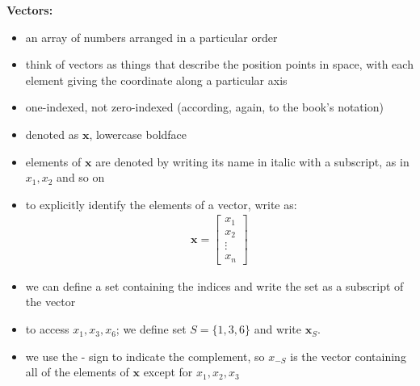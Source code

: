 \documentclass[11pt,twocolumn]{report}
\begin{document}
\large\textbf{Vectors:}
\begin{itemize}
	\item an array of numbers arranged in a particular order
	\item think of vectors as things that describe the position points in space,
		with each element giving the coordinate along a particular axis
	\item one-indexed, not zero-indexed (according, again, to the book's notation)
	\item denoted as $\bm{x}$, lowercase boldface
	\item elements of $\bm{x}$ are denoted by writing its name in italic with a
		subscript, as in \textbf{$x_1, x_2$} and so on
	\item to explicitly identify the elements of a vector, write as:
		\begin{gather}
			\bm{x} = 
			\begin{bmatrix}
				x_1\\
				x_2\\
				\vdots\\
				x_n
			\end{bmatrix}
		\end{gather}
	\item we can define a set containing the indices and write the set as a
		subscript of the vector 
	\item to access $x_1, x_3, x_6$; we define set $S = \{1, 3, 6\}$ and write
		$\bm{x}_S$.
	\item we use the - sign to indicate the complement, so $x_{-S}$ is the vector
		containing all of the elements of $\bm{x}$ except for $x_1, x_2, x_3$
\end{itemize}
\end{document}

